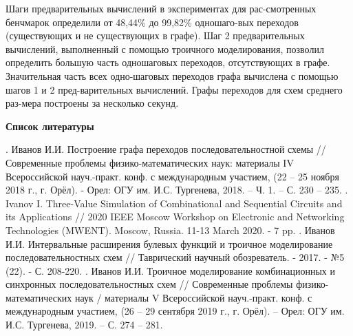 \documentclass[a4paper, 14pt]{article}
\begin{document}
Шаги предварительных вычислений в экспериментах для рас-смотренных бенчмарок определили от 48,44\% до 99,82\% одношаго-вых переходов (существующих и не существующих в графе). Шаг 2 предварительных вычислений, выполненный с помощью троичного моделирования, позволил определить большую часть одношаговых переходов, отсутствующих в графе. Значительная часть всех одно-шаговых переходов графа вычислена с помощью шагов 1 и 2 пред-варительных вычислений. Графы переходов для схем среднего раз-мера построены за несколько секунд.  
\begin{center}
{\bf Список литературы}
\end{center}
. Иванов И.И. Построение графа переходов последовательностной схемы // Современные проблемы физико-математических наук: материалы IV Всероссийской науч.-практ. конф. с международным участием, (22 – 25 ноября 2018 г., г. Орёл). - Орел: ОГУ им. И.С. Тургенева, 2018. – Ч. 1. – С. 230 – 235.
. Ivanov I. Three-Value Simulation of Combinational and Sequential Circuits and its Applications // 2020 IEEE Moscow Workshop on Electronic and Networking Technologies (MWENT). Moscow, Russia. 11-13 March 2020. - 7 pp.
. Иванов И.И. Интервальные расширения булевых функций и троичное моделирование последовательностных схем // Таврический научный обозреватель. - 2017. - №5 (22). - С. 208-220.
. Иванов И.И. Троичное моделирование комбинационных и синхронных последовательностных схем // Современные проблемы физико-математических наук / материалы V Всероссийской науч.-практ. конф. с международным участием, (26 – 29 сентября 2019 г., г. Орёл). – Орел: ОГУ им. И.С. Тургенева, 2019. – С. 274 – 281.
\end{document}
